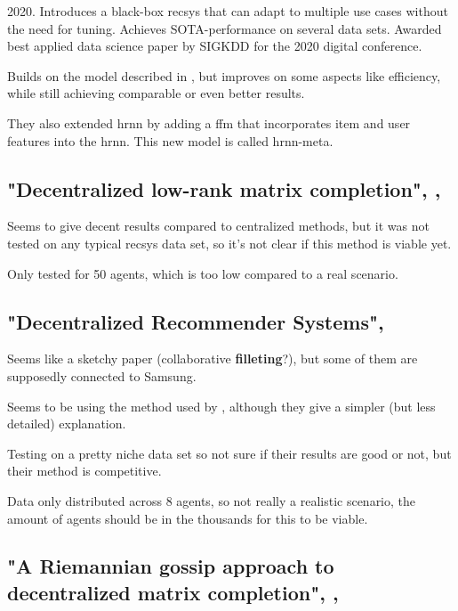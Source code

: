 2020. Introduces a black-box \acrshort{recsys} that can adapt to multiple use cases without the need for tuning. Achieves SOTA-performance on several data sets. Awarded best applied data science paper by SIGKDD for the 2020 digital conference.

Builds on the model described in \cite{QuadranaKHC17}, but improves on some aspects like efficiency, while still achieving comparable or even better results.

They also extended \acrshort{hrnn} by adding a \acrfull{ffm} that incorporates item and user features into the \acrshort{hrnn}. This new model is called \acrshort{hrnn}-meta.

\subsection{"Decentralized low-rank matrix completion", \citeyear{dezlowrank}, \cite{dezlowrank}}
\label{sec:dezlowrank}

Seems to give decent results compared to centralized methods, but it was not tested on any typical \acrshort{recsys} data set, so it's not clear if this method is viable yet.

Only tested for 50 agents, which is too low compared to a real scenario.

\subsection{"Decentralized Recommender Systems", \citeyear{WangLCZQH15} \cite{WangLCZQH15}}

Seems like a sketchy paper (collaborative \textbf{filleting}?), but some of them are supposedly connected to Samsung. 

Seems to be using the method used by \cite{dezlowrank}, although they give a simpler (but less detailed) explanation.

Testing on a pretty niche data set so not sure if their results are good or not, but their method is competitive.

Data only distributed across 8 agents, so not really a realistic scenario, the amount of agents should be in the thousands for this to be viable.

\subsection{"A Riemannian gossip approach to decentralized matrix completion", \citeyear{mishra2016riemannian}, \cite{mishra2016riemannian}}
\label{sec:mishra2016riemannian}

